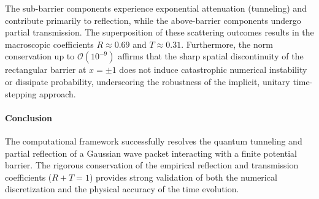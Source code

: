 \begin{solution}
	The sub-barrier components experience exponential attenuation (tunneling) and
	contribute primarily to reflection, while the above-barrier components undergo
	partial transmission. The superposition of these scattering outcomes results in
	the macroscopic coefficients $R \approx 0.69$ and $T \approx 0.31$. Furthermore,
	the norm conservation up to $\mathcal{O}(10^{-9})$ affirms that the sharp
	spatial discontinuity of the rectangular barrier at $x = \pm 1$ does not induce
	catastrophic numerical instability or dissipate probability, underscoring the
	robustness of the implicit, unitary time-stepping approach.

	\paragraph{Conclusion}
	The computational framework successfully resolves the quantum tunneling and
	partial reflection of a Gaussian wave packet interacting with a finite potential
	barrier. The rigorous conservation of the empirical reflection and transmission
	coefficients ($R + T = 1$) provides strong validation of both the numerical
	discretization and the physical accuracy of the time evolution.

\end{solution}

